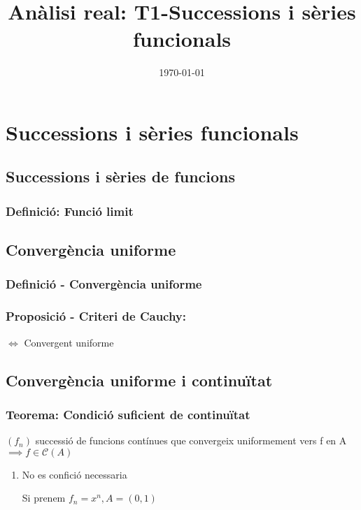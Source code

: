 \documentclass[11pt]{article}
\date{\today}
\title{Anàlisi real: T1-Successions i sèries funcionals}
\begin{document}
\maketitle
\setcounter{tocdepth}{4}
\tableofcontents



\section{Successions i sèries funcionals}
\label{sec:org9d009c7}

\subsection{Successions i sèries de funcions}
\label{sec:orgc8b6f89}

\subsubsection{Definició: Funció limit}
\label{sec:org27e2745}

\subsection{Convergència uniforme}
\label{sec:orgccff980}
\subsubsection{Definició - Convergència uniforme}
\label{sec:org406e1d9}
\subsubsection{Proposició - Criteri de Cauchy:}
\label{sec:orgf1e420f}
\(\iff\) Convergent uniforme
\subsection{Convergència uniforme i continuïtat}
\label{sec:org9fb03bd}
\subsubsection{Teorema: Condició suficient de continuïtat}
\label{sec:org83bab42}
\((f_{n})\) successió de funcions contínues que convergeix uniformement vers f en A \(\implies f \in \mathcal{C}(A)\)
\begin{enumerate}
\item No es confició necessaria
\label{sec:orgb262a12}

Si prenem \(f_{n} = x^{n}, A = (0, 1)\)
\end{enumerate}
\end{document}
